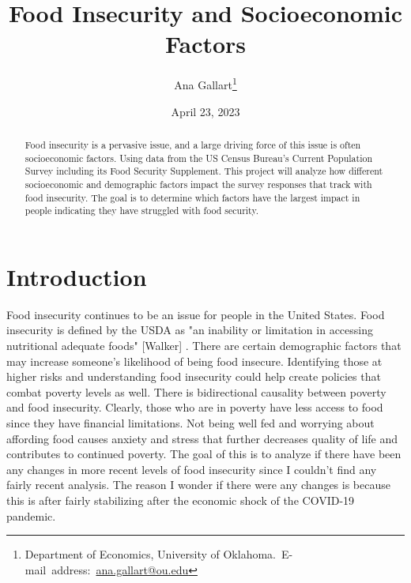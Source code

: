 \documentclass[12pt,english]{article}
\begin{document}
\begin{singlespace}
\title{Food Insecurity and Socioeconomic Factors}
\end{singlespace}

\author{Ana Gallart\thanks{Department of Economics, University of Oklahoma.\
E-mail~address:~\href{mailto:ana.gallart@ou.edu}{ana.gallart@ou.edu}}}

\date{April 23, 2023}

\maketitle

\begin{abstract}
\begin{singlespace}
Food insecurity is a pervasive issue, and a large driving force of this issue is often socioeconomic factors. Using data from the US Census Bureau's Current Population Survey including its Food Security Supplement. This project will analyze how different socioeconomic and demographic factors impact the survey responses that track with food insecurity. The goal is to determine which factors have the largest impact in people indicating they have struggled with food security.

\end{singlespace}

\end{abstract}
\vfill{}


\pagebreak{}


\section{Introduction}\label{sec:intro}
Food insecurity continues to be an issue for people in the United States. Food insecurity is defined by the USDA as "an inability or limitation in accessing nutritional adequate foods" [Walker] \citet{WalkerRebekahJ}.  There are certain demographic factors that may increase someone's likelihood of being food insecure. Identifying those at higher risks and understanding food insecurity could help create policies that combat poverty levels as well. There is bidirectional causality between poverty and food insecurity. Clearly, those who are in poverty have less access to food since they have financial limitations. Not being well fed and worrying about affording food causes anxiety and stress that further decreases quality of life and contributes to continued poverty. The goal of this is to analyze if there have been any changes in more recent levels of food insecurity since I couldn't find any fairly recent analysis. The reason I wonder if there were any changes is because this is after fairly stabilizing after the economic shock of the COVID-19 pandemic.
\end{document}
